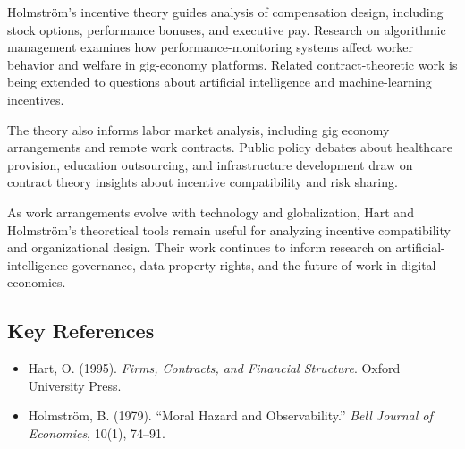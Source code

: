 Holmström's incentive theory guides analysis of compensation design, including
stock options, performance bonuses, and executive pay. Research on algorithmic
management examines how performance-monitoring systems affect worker behavior and
welfare in gig-economy platforms. Related contract-theoretic work is being
extended to questions about artificial intelligence and machine-learning
incentives.

The theory also informs labor market analysis, including gig economy arrangements
and remote work contracts. Public policy debates about healthcare provision,
education outsourcing, and infrastructure development draw on contract theory
insights about incentive compatibility and risk sharing.

As work arrangements evolve with technology and globalization, Hart and
Holmström's theoretical tools remain useful for analyzing incentive compatibility
and organizational design. Their work continues to inform research on artificial-
intelligence governance, data property rights, and the future of work in digital
economies.

\subsection*{Key References}
\begin{itemize}
    \item Hart, O. (1995). \textit{Firms, Contracts, and Financial Structure}. Oxford University Press.
    \item Holmström, B. (1979). ``Moral Hazard and Observability.'' \textit{Bell Journal of Economics}, 10(1), 74--91.
\end{itemize}
